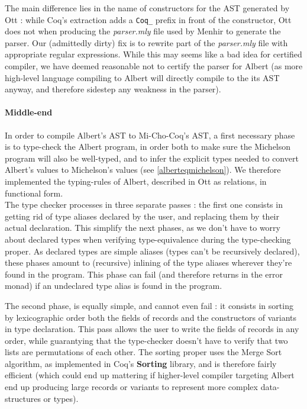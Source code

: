 \documentclass{report}
\begin{document}
The main difference lies in the name of constructors for the AST generated by Ott : while Coq's extraction adds a \texttt{Coq\_} prefix in front of the constructor, Ott does not when producing the \textit{parser.mly} file used by Menhir to generate the parser. Our (admittedly dirty) fix is to rewrite part of the \textit{parser.mly} file with appropriate regular expressions. While this may seems like a bad idea for certified compiler, we have deemed reasonable not to certify the parser for Albert (as more high-level language compiling to Albert will directly compile to the its AST anyway, and therefore sidestep any weakness in the parser).

\paragraph{Middle-end}

In order to compile Albert's AST to Mi-Cho-Coq's AST, a first necessary phase is to type-check the Albert program, in order both to make sure the Michelson program will also be well-typed, and to infer the explicit types needed to convert Albert's values to Michelson's values (see \ref{alberteqmichelson}). We therefore implemented the typing-rules of Albert, described in Ott as relations, in functional form.\\

The type checker processes in three separate passes : the first one consists in getting rid of type aliases declared by the user, and replacing them by their actual declaration. This simplify the next phases, as we don't have to worry about declared types when verifying type-equivalence during the type-checking proper. As declared types are simple aliases (types can't be recursively declared), these phases amount to (recursive) inlining of the type aliases wherever they're found in the program. This phase can fail (and therefore returns in the error monad) if an undeclared type alias is found in the program.

The second phase, is equally simple, and cannot even fail : it consists in sorting by lexicographic order both the fields of records and the constructors of variants in type declaration. This pass allows the user to write the fields of records in any order, while guarantying that the type-checker doesn't have to verify that two lists are permutations of each other. The sorting proper uses the Merge Sort algorithm, as implemented in Coq's \textbf{Sorting} library, and is therefore fairly efficient (which could end up mattering if higher-level compiler targeting Albert end up producing large records or variants to represent more complex data-structures or types).\\
\end{document}
